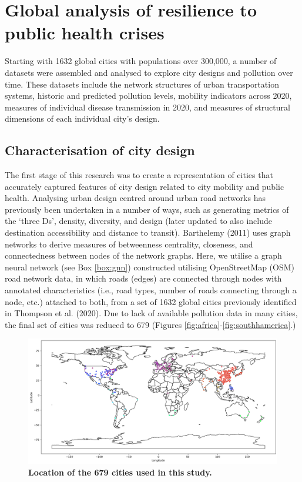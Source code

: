 \documentclass[preprint,10pt]{elsarticle} %
\begin{document}
\section*{\textcolor{OliveGreen}{Global analysis of resilience to public health crises}}

Starting with 1632 global cities with populations over 300,000\cite{UNDESA2019}, a number of datasets were assembled and analysed to explore city designs and pollution over time. These datasets include the network structures of urban transportation systems, historic and predicted pollution levels, mobility indicators across 2020, measures of individual disease transmission in 2020, and measures of structural dimensions of each individual city's design.

\subsection*{Characterisation of city design}
The first stage of this research was to create a representation of cities that accurately captured features of city design related to city mobility and public health. Analysing urban design centred around urban road networks has previously been undertaken in a number of ways, such as generating metrics of the `three Ds'\cite{Ewing2010}, density, diversity, and design (later updated to also include destination accessibility and distance to transit). Barthelemy (2011)\cite{Barthelemy2011} uses graph networks to derive measures of betweenness centrality, closeness, and connectedness between nodes of the network graphs. Here, we utilise a graph neural network (see Box \ref{box:gnn}) constructed utilising OpenStreetMap (OSM) road network data\cite{Boeing2017a}, in which roads (edges) are connected through nodes with annotated characteristics (i.e., road types, number of roads connecting through a node, etc.) attached to both, from a set of 1632 global cities previously identified in Thompson et al. (2020)\cite{Thompson2020}. Due to lack of available pollution data in many cities, the final set of cities was reduced to 679 (Figures \ref{fig:africa}-\ref{fig:southhamerica}.) 


\begin{figure}
\centering
\includegraphics[trim={0 0 0 0},clip,scale=0.4]{Images/ByCountry_map_Zeigler.png}
\caption{\bf Location of the 679 cities used in this study.}
 \label{fig:clusters}
\end{figure}
\end{document}
